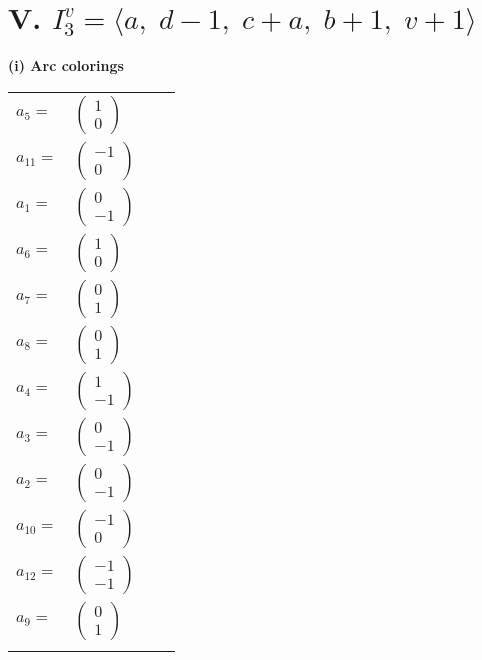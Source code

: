 \documentclass[1p]{elsarticle_modified}
\theoremstyle{definition}
\begin{document}
\centering \section*{V. $I^v_{3}= \langle a,\;d-1,\;c+a,\;b+1,\;v+1 \rangle$}
\flushleft \textbf{(i) Arc colorings}\\
\begin{tabular}{m{7pt} m{180pt} m{7pt} m{180pt} }
\flushright $a_{5}=$&$\begin{pmatrix}1\\0\end{pmatrix}$ \\
\flushright $a_{11}=$&$\begin{pmatrix}-1\\0\end{pmatrix}$ \\
\flushright $a_{1}=$&$\begin{pmatrix}0\\-1\end{pmatrix}$ \\
\flushright $a_{6}=$&$\begin{pmatrix}1\\0\end{pmatrix}$ \\
\flushright $a_{7}=$&$\begin{pmatrix}0\\1\end{pmatrix}$ \\
\flushright $a_{8}=$&$\begin{pmatrix}0\\1\end{pmatrix}$ \\
\flushright $a_{4}=$&$\begin{pmatrix}1\\-1\end{pmatrix}$ \\
\flushright $a_{3}=$&$\begin{pmatrix}0\\-1\end{pmatrix}$ \\
\flushright $a_{2}=$&$\begin{pmatrix}0\\-1\end{pmatrix}$ \\
\flushright $a_{10}=$&$\begin{pmatrix}-1\\0\end{pmatrix}$ \\
\flushright $a_{12}=$&$\begin{pmatrix}-1\\-1\end{pmatrix}$ \\
\flushright $a_{9}=$&$\begin{pmatrix}0\\1\end{pmatrix}$\\&\end{tabular}
\end{document}
